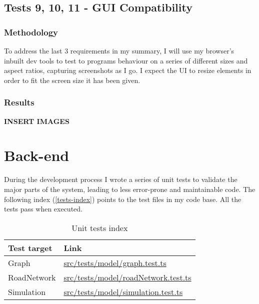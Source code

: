     \subsection{Tests 9, 10, 11 - GUI Compatibility}

        \subsubsection{Methodology}

            To address the last 3 requirements in my summary, I will use my browser's inbuilt dev tools to test to programs behaviour on a series of different sizes and aspect ratios, capturing screenshots as I go. I expect the UI to resize elements in order to fit the screen size it has been given.

        \subsubsection{Results}

            \textbf{INSERT IMAGES}

\section{Back-end}

    During the development process I wrote a series of unit tests to validate the major parts of the system, leading to less error-prone and maintainable code. The following index (\autoref{tests-index}) points to the test files in my code base. All the tests pass when executed.

    \begin{table}[h]
        \begin{tabular}{|p{}|p{}|}
            \hline
            \textbf{Test target} & \textbf{Link}\\\hline
            Graph & \href{https://github.com/joshua-smart/traffic-simulator/blob/main/src/tests/model/graph.test.ts}{src/tests/model/graph.test.ts}\\\hline
            RoadNetwork & \href{https://github.com/joshua-smart/traffic-simulator/blob/main/src/tests/model/roadNetwork.test.ts}{src/tests/model/roadNetwork.test.ts}\\\hline
            Simulation & \href{https://github.com/joshua-smart/traffic-simulator/blob/main/src/tests/model/simulation.test.ts}{src/tests/model/simulation.test.ts}\\\hline
        \end{tabular}
        \caption{Unit tests index}
        \label{tests-index}
    \end{table}
